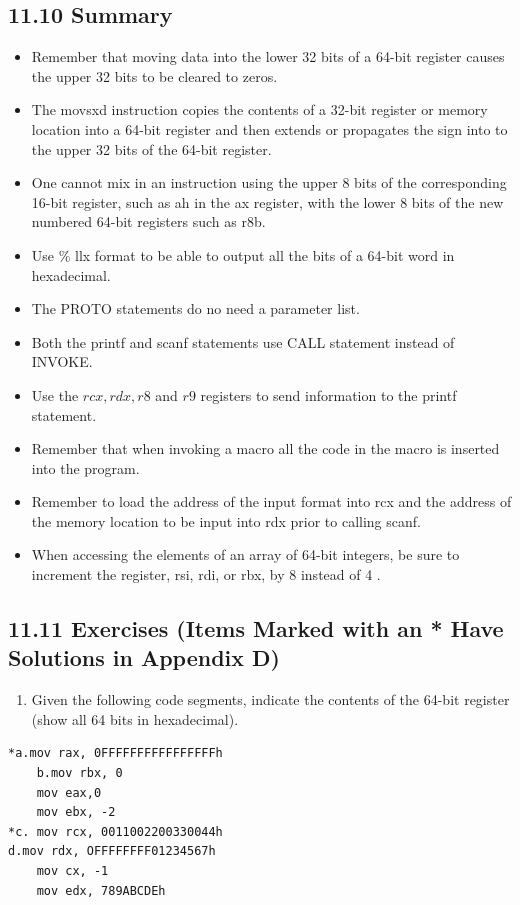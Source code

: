 \documentclass[10pt]{book}
\begin{document}
\begin{center}
\begin{center}
\begin{center}
\begin{center}
\subsection*{11.10 Summary}
\begin{itemize}
  \item Remember that moving data into the lower 32 bits of a 64-bit register causes the upper 32 bits to be cleared to zeros.
  \item The movsxd instruction copies the contents of a 32-bit register or memory location into a 64-bit register and then extends or propagates the sign into to the upper 32 bits of the 64-bit register.
  \item One cannot mix in an instruction using the upper 8 bits of the corresponding 16-bit register, such as ah in the ax register, with the lower 8 bits of the new numbered 64-bit registers such as r8b.
  \item Use \% llx format to be able to output all the bits of a 64-bit word in hexadecimal.
  \item The PROTO statements do no need a parameter list.
  \item Both the printf and scanf statements use CALL statement instead of INVOKE.
  \item Use the $r c x, r d x, r 8$ and $r 9$ registers to send information to the printf statement.
  \item Remember that when invoking a macro all the code in the macro is inserted into the program.
  \item Remember to load the address of the input format into rcx and the address of the memory location to be input into rdx prior to calling scanf.
  \item When accessing the elements of an array of 64-bit integers, be sure to increment the register, rsi, rdi, or rbx, by 8 instead of 4 .
\end{itemize}

\subsection*{11.11 Exercises (Items Marked with an * Have Solutions in Appendix D)}
\begin{enumerate}
  \item Given the following code segments, indicate the contents of the 64-bit register (show all 64 bits in hexadecimal).
\end{enumerate}


\begin{verbatim}
*a.mov rax, 0FFFFFFFFFFFFFFFFh
    b.mov rbx, 0
    mov eax,0
    mov ebx, -2
*c. mov rcx, 0011002200330044h
d.mov rdx, OFFFFFFFF01234567h
    mov cx, -1
    mov edx, 789ABCDEh
\end{verbatim}


\end{center}
\end{center}
\end{center}
\end{center}
\end{document}
